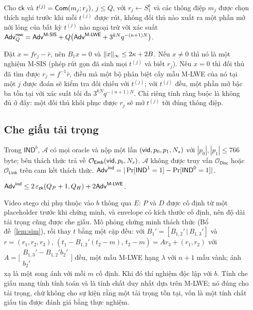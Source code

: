 \begin{lemma}
\label{lem:row}
Cho $\mathsf{ck}$ và $t^{(j)}=\mathsf{Com}(m_j;r_j)$, $j\le Q$, với
$r_j\leftarrow S_1^k$ và các thông điệp $m_j$ được chọn thích nghi trước khi mỗi
$t^{(j)}$ được rút, không đối thủ nào xuất ra một phần mở nới lỏng của bất kỳ
$t^{(j)}$ nào ngoại trừ với xác suất
$\mathsf{Adv}^{\mathsf{row}}_Q=\mathsf{Adv}^{\textsf{M-SIS}}+Q\bigl(\mathsf{Adv}^{\textsf{M-LWE}}+3^{kN}q^{-(n+1)N}\bigr)$.
\end{lemma}
\noindent
Đặt $x=fr_j-\bar r$, nên $B_1x=0$ và $\lVert x \rVert_\infty\le2\kappa+2B$. Nếu
$x\neq0$ thì nó là một nghiệm M-SIS (phép rút gọn đã sinh mọi $t^{(j)}$ và biết
$r_j$). Nếu $x=0$ thì đối thủ đã tìm được $r_j=f^{-1}\bar r$, điều mà một bộ
phân biệt cấy mẫu M-LWE của nó tại một $j$ được đoán sẽ kiểm tra đối chiếu với
$t^{(j)}$; với $t^{(j)}$ đều, một phần mở bậc ba tồn tại với xác suất tối đa
$3^{kN}q^{-(n+1)N}$. Chỉ riêng tính ràng buộc là không đủ ở đây: một đối thủ
khôi phục được $r_j$ sẽ mở $t^{(j)}$ tới đúng thông điệp.

\subsection{Che giấu tải trọng}
\label{sec:sec-hiding}

\begin{definition}
\label{def:hiding}
Trong $\mathsf{IND}^b$, $\mathcal A$ có mọi oracle và nộp một lần
$(\mathsf{vid},p_0,p_1,N_s)$ với $|p_0|,|p_1|\le766$ byte; bên thách thức trả về
$\mathcal O_{\mathsf{Emb}}(\mathsf{vid},p_b,N_s)$. $\mathcal A$ không được truy vấn
$\mathcal O_{\mathsf{Disc}}$ hoặc $\mathcal O_{\mathsf{Link}}$ trên cam kết
thách thức. $\mathsf{Adv}^{\mathsf{ind}}=|\Pr[\mathsf{IND}^1=1]-\Pr[\mathsf{IND}^0=1]|$.
\end{definition}

\begin{theorem}
\label{thm:hiding}
$\mathsf{Adv}^{\mathsf{ind}}\le2\,\varepsilon_{\mathsf{zk}}(Q_P+1,Q_H)+2\mathsf{Adv}^{\textsf{M-LWE}}$.
\end{theorem}
\noindent
Video stego chỉ phụ thuộc vào $b$ thông qua $E$: $P$ và $D$ được cố định từ một
placeholder trước khi chứng minh, và envelope có kích thước cố định, nên độ dài
tải trọng cũng được che giấu. Mô phỏng chứng minh thách thức
(Bổ đề~\ref{lem:sim}), rồi thay $t$ bằng một cặp đều: với
$B_1'=[B_{1,2}'\,|\,B_{1,3}']$ và $r=(r_1,r_2,r_3)$,
$(t_1-B_{1,2}'(t_2-m),\,t_2-m)=A r_3+(r_1,r_2)$ với
$A=\bigl[\begin{smallmatrix}B_{1,3}'-B_{1,2}'b_2'\\ b_2'\end{smallmatrix}\bigr]$
đều, một mẫu M-LWE hạng $\lambda$ với $n+1$ mẫu vành; ánh xạ là một song ánh với
mỗi $m$ cố định. Khi đó thí nghiệm độc lập với $b$. Tính che giấu mang tính tính
toán và là tính chất duy nhất dựa trên M-LWE; nó đúng cho tải trọng, chứ không
cho sự kiện rằng một tải trọng tồn tại, vốn là một tính chất giấu tin được đánh
giá bằng thực nghiệm.

